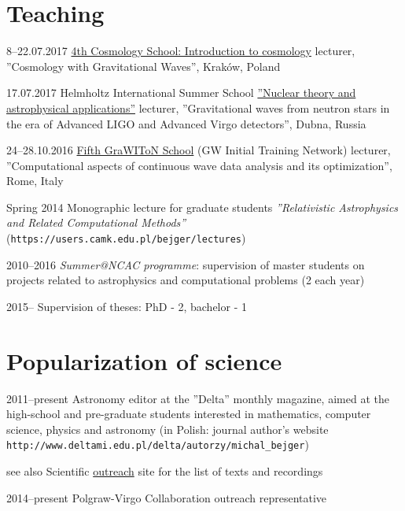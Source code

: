 \documentclass[]{friggeri-cv} %
\begin{document}
\section{Teaching}
\begin{entrylistshort}

\entrys
{8--22.07.2017}
{\href{http://cosmoschool2018.oa.uj.edu.pl}{4th Cosmology School: Introduction to cosmology} lecturer, ''Cosmology with Gravitational Waves'', Kraków, Poland}

\entrys
{17.07.2017} 
{Helmholtz International Summer School \href{http://theor.jinr.ru/~ntaa/17}{''Nuclear theory and astrophysical applications''} lecturer, ''Gravitational waves from neutron stars in the era of Advanced LIGO and Advanced Virgo detectors'', Dubna, Russia}  

\entrys
{24--28.10.2016}
{\href{https://events.ego-gw.it/indico/conferenceDisplay.py?ovw=True\&confId=44}{Fifth GraWIToN School} (GW Initial Training Network) lecturer, ''Computational aspects of continuous wave data analysis and its optimization'', Rome, Italy}

\entrys
{Spring 2014}
{Monographic lecture for graduate students {\it ''Relativistic Astrophysics and Related Computational Methods''} ({\tt https://users.camk.edu.pl/bejger/lectures})} 

\entrys
{2010--2016} 
{{\it Summer@NCAC programme}: supervision of master students on projects related to astrophysics and computational problems (2 each year)} 

\entrys
{2015--} 
{Supervision of theses: PhD - 2, bachelor - 1} 
\end{entrylistshort}


\pagebreak 

\section{Popularization of science}
\begin{entrylistshort}

\entrys 
{2011--present} 
{Astronomy editor at the ''Delta'' monthly magazine, aimed at the high-school and pre-graduate students interested in mathematics, computer science, physics and astronomy (in Polish: journal author's website {\tt http://www.deltami.edu.pl/delta/autorzy/michal\_bejger})} 

\entrys
{see also} 
{Scientific \href{http://users.camk.edu.pl/bejger/outreach/}{outreach} site for the list of texts and recordings} 

\entrys
{2014--present} 
{Polgraw-Virgo Collaboration outreach representative} 
\end{entrylistshort}
\end{document}
